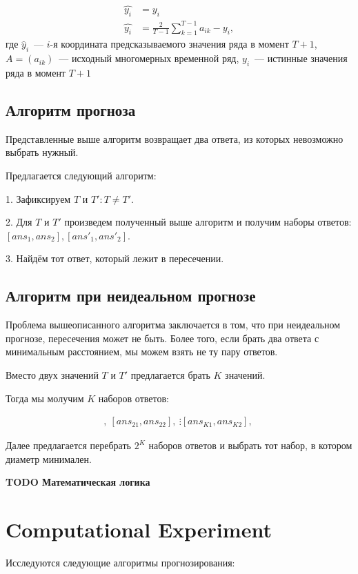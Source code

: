 \documentclass{article}
\begin{document}
\begin{align*}
	\hat{y_i} &= y_i\\
	\hat{y_i} &= \frac{2}{T-1} \sum_{k=1}^{T-1} a_{ik} - y_i,
\end{align*}
где $\hat{y}_i$~--- $i$-я координата предсказываемого значения ряда в момент $T+1$, $A=(a_{ik})$~--- исходный многомерных временной ряд, $y_i$~--- истинные значения ряда в момент $T+1$

\subsection{Алгоритм прогноза}

Представленные выше алгоритм возвращает два ответа, из которых невозможно выбрать нужный.

Предлагается следующий алгоритм:

1. Зафиксируем $T$ и $T': T \neq T'$.

2. Для $T$ и $T'$ произведем полученный выше алгоритм и получим наборы ответов: $[ans_1, ans_2], [ans'_1, ans'_2]$.

3. Найдём тот ответ, который лежит в пересечении.

\subsection{Алгоритм при неидеальном прогнозе}

Проблема вышеописанного алгоритма заключается в том, что при неидеальном прогнозе, пересечения может не быть. Более того, если брать два ответа с минимальным расстоянием, мы можем взять не ту пару ответов.

Вместо двух значений  $T$ и $T'$ предлагается брать $K$ значений.

Тогда мы молучим $K$ наборов ответов:

\begin{gather*}
	[ans_{11}, ans_{12}],\
	[ans_{21}, ans_{22}],\
	\vdots
	[ans_{K1}, ans_{K2}],\
\end{gather*}

Далее предлагается перебрать $2^K$ наборов ответов и выбрать тот набор, в котором диаметр минимален.

\textbf{TODO Математическая логика}

\section{Computational Experiment}

Исследуются следующие алгоритмы прогнозирования:
\end{document}
